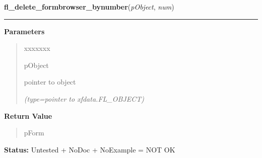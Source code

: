 \hspace{.8\funcindent}\begin{boxedminipage}{\funcwidth}

    \raggedright \textbf{fl\_delete\_formbrowser\_bynumber}(\textit{pObject}, \textit{num})

    \vspace{-1.5ex}

    \rule{\textwidth}{0.5\fboxrule}
\setlength{\parskip}{2ex}
\setlength{\parskip}{1ex}
      \textbf{Parameters}
      \vspace{-1ex}

      \begin{quote}
        \begin{Ventry}{xxxxxxx}

          \item[pObject]

          pointer to object

            {\it (type=pointer to xfdata.FL\_OBJECT)}

        \end{Ventry}

      \end{quote}

      \textbf{Return Value}
    \vspace{-1ex}

      \begin{quote}
      pForm

      \end{quote}

\textbf{Status:} Untested + NoDoc + NoExample = NOT OK



    \end{boxedminipage}

    \label{xformslib:library:fl_delete_formbrowser}

    \vspace{0.5ex}

